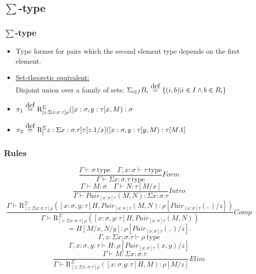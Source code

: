 \documentclass[aspectratio=169]{beamer}
\newcommand{\typ}{\ \mathrm{type}}
\newcommand{\pair}[2]{Pair_{[x:\sigma]\tau}(#1, #2)}
\newcommand{\R}[2]{\mathrm{R}_{[z:\Sigma x:\sigma.\tau]\rho}^{\Sigma}(#1, #2)}
\newcommand{\C}{Comp}
\newcommand{\Intro}{Intro}
\newcommand{\F}{Form}
\newcommand{\E}{Elim}
\newcommand\defeq{\stackrel{\mathclap{\normalfont\mbox{def}}}{\ =\ }}
\newcommand{\Gamdash}{\Gamma\vdash}
\begin{document}
    \subsection{$\sum$-type}
    \begin{frame}
        \frametitle{$\sum$-type}
        \begin{itemize}
            \item Type former for pairs which the second element type depends on the first element.
            \item \underline{Set-theoretic equivalent:}\\
            Disjoint union over a family of sets: $\Sigma_{i\in I}B_i \defeq \{(i,b)|i \in I \wedge b \in B_i\}$
            \item $\pi_1 \defeq \R{[x:\sigma,y:\tau]x}{M}:\sigma$
            \item $\pi_2 \defeq \mathrm{R}^\Sigma_[z:\Sigma x:\sigma.\tau]\tau[z.1/x]([x:\sigma,y:\tau]y, M):\tau[M.1]$
        \end{itemize}
    \end{frame}
    \begin{frame}
        \frametitle{Rules}
        $$\frac{\Gamma \vdash \sigma \typ \quad \Gamma,x:\sigma\vdash \tau \typ}{\Gamdash \Sigma x:\sigma.\tau \typ}\F$$
        $$\frac{\Gamma \vdash M : \sigma\quad \Gamma \vdash N : \tau[M/x]}{\Gamma \vdash \pair{M}{N} : \Sigma x:\sigma.\tau}\Intro$$
        $$\frac{\Gamma \vdash \R{[x:\sigma,y:\tau]H}{\pair{M}{N}:\rho[\pair{}{}/z]}}{\Gamma \vdash \R{[x:\sigma,y:\tau]H}{\pair{M}{N}}}\C$$
        $$=H[M/x,N/y]:\rho[\pair{}{}/z].$$
        $$\Gamma,z:\Sigma x:\sigma.\tau \vdash \rho \typ$$
        $$\Gamma,x:\sigma,y:\tau\vdash H:\rho [\pair{x}{y}/z]$$
        $$\frac{\quad \Gamma \vdash M : \Sigma x:\sigma.\tau}{\Gamma \vdash \R{[x:\sigma.y:\tau]H}{M}:\rho[M/z]}\E$$
    \end{frame}
\end{document}
